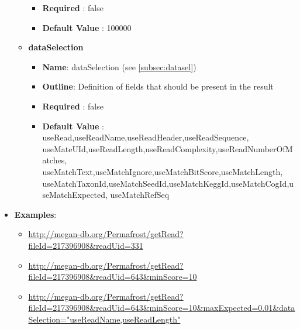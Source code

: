 \documentclass[11pt]{article}
\begin{document}
\begin{itemize}
\begin{itemize}
\begin{itemize}
					\item \textbf{Required} : false
					\item \textbf{Default Value} : 100000
				\end{itemize}
			\item \textbf{dataSelection}
				\begin{itemize}
					\item \textbf{Name}: dataSelection (see \ref{subsec:datasel})
					\item \textbf{Outline}: Definition of fields that should be present in the result
					\item \textbf{Required} : false
					\item \textbf{Default Value} : useRead,useReadName,useReadHeader,useReadSequence, useMateUId,useReadLength,useReadComplexity,useReadNumberOfMatches, useMatchText,useMatchIgnore,useMatchBitScore,useMatchLength, useMatchTaxonId,useMatchSeedId,useMatchKeggId,useMatchCogId,useMatchExpected, useMatchRefSeq
				\end{itemize}
		\end{itemize}
	\item \textbf{Examples}:
		\begin{itemize}
			\item \url{http://megan-db.org/Permafrost/getRead?fileId=217396908&readUid=331}
			\item \url{http://megan-db.org/Permafrost/getRead?fileId=217396908&readUid=643&minScore=10}
			\item \url{http://megan-db.org/Permafrost/getRead?fileId=217396908&readUid=643&minScore=10&maxExpected=0.01&dataSelection="useReadName,useReadLength"}
		\end{itemize}
\end{itemize}
\end{document}

